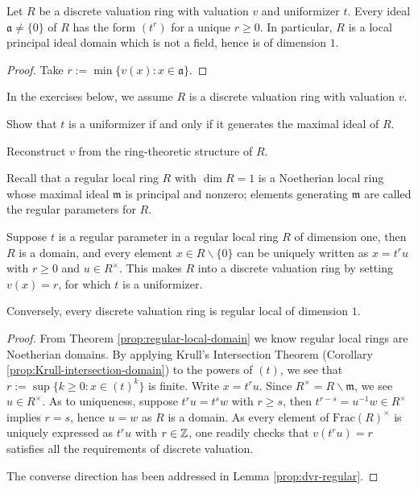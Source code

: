 \begin{lemma}\label{prop:dvr-regular}
	Let $R$ be a discrete valuation ring with valuation $v$ and uniformizer $t$. Every ideal $\mathfrak{a} \neq \{0\}$ of $R$ has the form $(t^r)$ for a unique $r \geq 0$. In particular, $R$ is a local principal ideal domain which is not a field, hence is of dimension $1$.
\end{lemma}
\begin{proof}
	Take $r := \min\{v(x) : x \in \mathfrak{a} \}$.
\end{proof}

In the exercises below, we assume $R$ is a discrete valuation ring with valuation $v$.
\begin{exercise}
	Show that $t$ is a uniformizer if and only if it generates the maximal ideal of $R$.
\end{exercise}
\begin{exercise}
	Reconstruct $v$ from the ring-theoretic structure of $R$.
\end{exercise}

Recall that a regular local ring $R$ with $\dim R = 1$ is a Noetherian local ring whose maximal ideal $\mathfrak{m}$ is principal and nonzero; elements generating $\mathfrak{m}$ are called the regular parameters for $R$.
\begin{proposition}\label{prop:reg-local-dvr}
	Suppose $t$ is a regular parameter in a regular local ring $R$ of dimension one, then $R$ is a domain, and every element $x \in R \smallsetminus \{0\}$ can be uniquely written as $x = t^r u$ with $r \geq 0$ and $u \in R^\times$. This makes $R$ into a discrete valuation ring by setting $v(x) = r$, for which $t$ is a uniformizer.
	
	Conversely, every discrete valuation ring is regular local of dimension $1$.
\end{proposition}
\begin{proof}
	From Theorem \ref{prop:regular-local-domain} we know regular local rings are Noetherian domains. By applying Krull's Intersection Theorem (Corollary \ref{prop:Krull-intersection-domain}) to the powers of $(t)$, we see that $r := \sup\{k \geq 0: x \in (t)^k \}$ is finite. Write $x = t^r u$. Since $R^\times = R \smallsetminus \mathfrak{m}$, we see $u \in R^\times$. As to uniqueness, suppose $t^r u = t^s w$ with $r \geq s$, then $t^{r-s} = u^{-1}w \in R^\times$ implies $r=s$, hence $u=w$ as $R$ is a domain. As every element of $\text{Frac}(R)^\times$ is uniquely expressed as $t^r u$ with $r \in \mathbb{Z}$, one readily checks that $v(t^r u) = r$ satisfies all the requirements of discrete valuation.
	
	The converse direction has been addressed in Lemma \ref{prop:dvr-regular}.
\end{proof}

